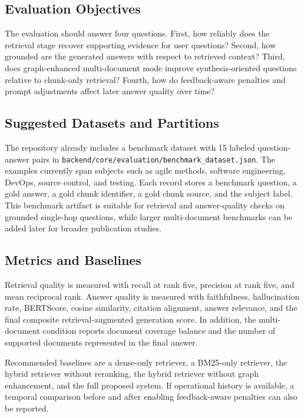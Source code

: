 \documentclass[11pt,a4paper]{article}
\begin{document}
\subsection{Evaluation Objectives}

The evaluation should answer four questions. First, how reliably does the retrieval stage recover supporting evidence for user questions? Second, how grounded are the generated answers with respect to retrieved context? Third, does graph-enhanced multi-document mode improve synthesis-oriented questions relative to chunk-only retrieval? Fourth, how do feedback-aware penalties and prompt adjustments affect later answer quality over time?

\subsection{Suggested Datasets and Partitions}

The repository already includes a benchmark dataset with 15 labeled question-answer pairs in \texttt{backend/core/evaluation/benchmark\_dataset.json}. The examples currently span subjects such as agile methods, software engineering, DevOps, source control, and testing. Each record stores a benchmark question, a gold answer, a gold chunk identifier, a gold chunk source, and the subject label. This benchmark artifact is suitable for retrieval and answer-quality checks on grounded single-hop questions, while larger multi-document benchmarks can be added later for broader publication studies.

\subsection{Metrics and Baselines}

Retrieval quality is measured with recall at rank five, precision at rank five, and mean reciprocal rank. Answer quality is measured with faithfulness, hallucination rate, BERTScore, cosine similarity, citation alignment, answer relevance, and the final composite retrieval-augmented generation score. In addition, the multi-document condition reports document coverage balance and the number of supported documents represented in the final answer.

Recommended baselines are a dense-only retriever, a BM25-only retriever, the hybrid retriever without reranking, the hybrid retriever without graph enhancement, and the full proposed system. If operational history is available, a temporal comparison before and after enabling feedback-aware penalties can also be reported.
\end{document}

